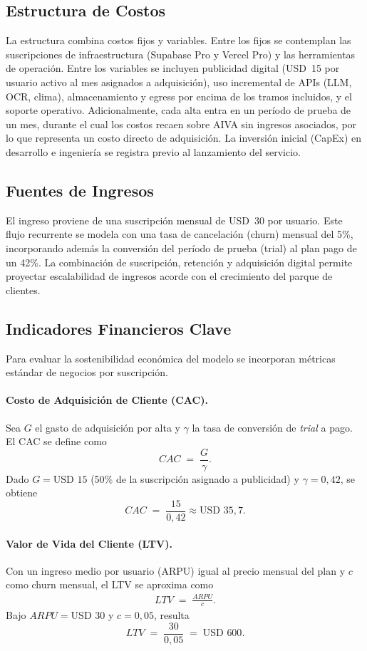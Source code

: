 \subsection{Estructura de Costos}
La estructura combina costos fijos y variables. Entre los fijos se contemplan las suscripciones de infraestructura (Supabase Pro y Vercel Pro) y las herramientas de operación. Entre los variables se incluyen publicidad digital (USD~15 por usuario activo al mes asignados a adquisición), uso incremental de APIs (LLM, OCR, clima), almacenamiento y egress por encima de los tramos incluidos, y el soporte operativo. Adicionalmente, cada alta entra en un período de prueba de un mes, durante el cual los costos recaen sobre AIVA sin ingresos asociados, por lo que representa un costo directo de adquisición. La inversión inicial (CapEx) en desarrollo e ingeniería se registra previo al lanzamiento del servicio.

\subsection{Fuentes de Ingresos}
El ingreso proviene de una suscripción mensual de USD~30 por usuario. Este flujo recurrente se modela con una tasa de cancelación (churn) mensual del 5\%, incorporando además la conversión del período de prueba (trial) al plan pago de un 42\%. La combinación de suscripción, retención y adquisición digital permite proyectar escalabilidad de ingresos acorde con el crecimiento del parque de clientes.

\subsection{Indicadores Financieros Clave}
Para evaluar la sostenibilidad económica del modelo se incorporan métricas estándar de negocios por suscripción.

\paragraph{Costo de Adquisición de Cliente (CAC).}
Sea $G$ el gasto de adquisición por alta y $\gamma$ la tasa de conversión de \emph{trial} a pago. El CAC se define como
\[
CAC \;=\; \frac{G}{\gamma}.
\]
Dado $G = \text{USD }15$ (50\% de la suscripción asignado a publicidad) y $\gamma = 0{,}42$, se obtiene
\[
CAC \;=\; \frac{15}{0{,}42} \approx \text{USD }35{,}7.
\]

\paragraph{Valor de Vida del Cliente (LTV).}
Con un ingreso medio por usuario (ARPU) igual al precio mensual del plan y $c$ como churn mensual, el LTV se aproxima como
\begin{align}
LTV \;=\; \frac{ARPU}{c}.
\end{align}
Bajo $ARPU = \text{USD }30$ y $c = 0{,}05$, resulta
\[
LTV \;=\; \frac{30}{0{,}05} \;=\; \text{USD }600.
\]

